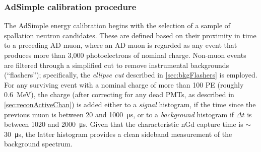\documentclass[../thesis.tex]{subfiles}
\begin{document}
\begin{comment}
  A sample enriched in such neutrons is obtained by selecting events in a time
  window (XXX define) immediately after AD muons (XXX of what minimum
  energy?). These captures are distributed uniformly throughout the GdLS, much
  like IBDs. The nGd capture peak in the charge distribution is fit to a
  Gaussian (XXX crystal ball?), and the location of the peak is defined as
  corresponding to 7.95 MeV (XXX) 8.0 MeV according to doc-7334 (AdSimple). This
  energy scale is stored in the offline database, valid for the period in which
  the neutrons were collected. In the near (far) halls, it takes XXX (YYY) days
  to obtain the necessary statistics; this is thus the time-resolution of the
  energy scale, which is sufficient, given that the light yield changes very
  slowly, declining by some 1\% to 1.5\% per year.
  
  24 hours
\end{comment}

\begin{comment}
  Figure out exactly what energy is pegged by AdSimple and AdScaled. 7.95 MeV?
  Discuss differences (e.g. due to muon afterpulsing?)  5x15min Co60 4x10hour
  AmC
\end{comment}

\subsubsection{AdSimple calibration procedure}
\label{sec:reconEnergyAdSimpleCalib}

The AdSimple energy calibration begins with the selection of a sample of
spallation neutron candidates. These are defined based on their proximity in
time to a preceding AD muon, where an AD muon is regarded as any event that
produces more than 3,000 photoelectrons of nominal charge. Non-muon events are
filtered through a simplified cut to remove instrumental backgrounds
(``flashers''); specifically, the \emph{ellipse cut} described in
\autoref{sec:bkgFlashers} is employed. For any surviving event with a nominal
charge of more than 100 PE (roughly 0.6~MeV), the charge (after correcting for
any dead PMTs, as described in \autoref{sec:reconActiveChan}) is added either to
a \emph{signal} histogram, if the time since the previous muon is between 20 and
\SI{1000}{\micro s}, or to a \emph{background} histogram if $\Delta t$ is
between 1020 and \SI{2000}{\micro s}. Given that the characteristic nGd capture
time is $\sim$\SI{30}{\micro s}, the latter histogram provides a clean sideband
measurement of the background spectrum.
\end{document}
